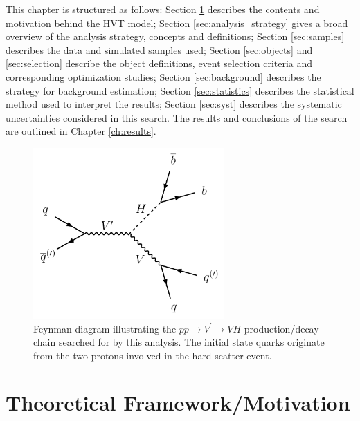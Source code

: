 This chapter is structured as follows: Section \ref{sec:theory_overview} describes the contents and motivation behind the HVT model; Section \ref{sec:analysis_strategy} gives a broad overview of the analysis strategy, concepts and definitions; Section \ref{sec:samples} describes the data and simulated samples used; Section \ref{sec:objects} and \ref{sec:selection} describe the object definitions, event selection criteria and corresponding optimization studies; Section \ref{sec:background} describes the strategy for background estimation; Section \ref{sec:statistics} describes the statistical method used to interpret the results; Section \ref{sec:syst} describes the systematic uncertainties considered in this search.
The results and conclusions of the search are outlined in Chapter \ref{ch:results}.

\begin{figure}
	\centering
	\includegraphics[width=0.65\textwidth,origin=c]{VH____qqbb_Feynman_Diagram}
	\caption{
	Feynman diagram illustrating the $pp \rightarrow V^\prime \rightarrow VH$ production/decay chain searched for by this analysis.
	The initial state quarks originate from the two protons involved in the hard scatter event.
	}
	\label{fig:feynman_diagram_VHqqbb}
\end{figure}

\section{Theoretical Framework/Motivation}
\label{sec:theory_overview}

